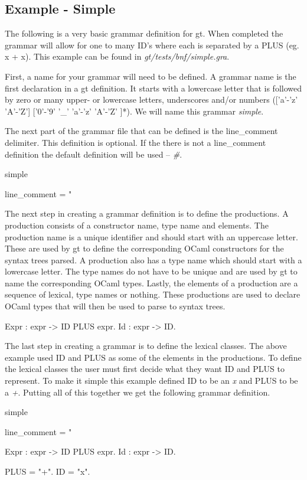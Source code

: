 \subsection{Example - Simple}
The following is a very basic grammar definition for gt. When completed the 
grammar will allow for one to many ID's where each is separated by a PLUS (eg. x + x). 
This example can be found in \textit{gt/tests/bnf/simple.gra}. 

First, a name for your grammar will need to be defined. A grammar name is the first declaration in a gt
definition. It starts with a lowercase letter that is followed
by zero or many upper- or lowercase letters, underscores and/or numbers (['a'-'z' 'A'-'Z']
['0'-'9' '\_' 'a'-'z' 'A'-'Z' ]*). We will name this grammar \textit{simple}.

The next part of the grammar file that can be defined is the line\_comment delimiter.
This definition is optional. If the there is not a line\_comment definition the default
definition will be used -- \textit{\#}.\\
\begin{gt}
simple

line_comment = "%
\end{gt} 

The next step in creating a grammar definition is to define the productions. A production consists of a
constructor name, type name and elements. The production name is a unique identifier and should
start with an uppercase letter. These are used by gt to define the corresponding OCaml constructors for
the syntax trees parsed. A production also has a type name which should start with a lowercase letter. The 
type names do not have to be unique and are used by gt to name the corresponding OCaml types. Lastly, 
the elements of a production are a sequence of lexical, type names or nothing. These productions are used
to declare OCaml types that will then be used to parse to syntax trees. \\
\begin{gt}
Expr : expr -> ID PLUS expr.
Id : expr -> ID.
\end{gt} 

The last step in creating a grammar is to define the lexical classes. The above example used ID and PLUS as
some of the elements in the productions. To define the lexical classes the user must first decide what they want 
ID and PLUS to represent. To make it simple this example defined ID to be an \textit{x} and PLUS to be a \textit{+}.
Putting all of this together we get the following grammar definition.\\
\begin{gt}
simple

line_comment = "%

Expr : expr -> ID PLUS expr.
Id : expr -> ID.

PLUS = "+".
ID = "x".
\end{gt} 





